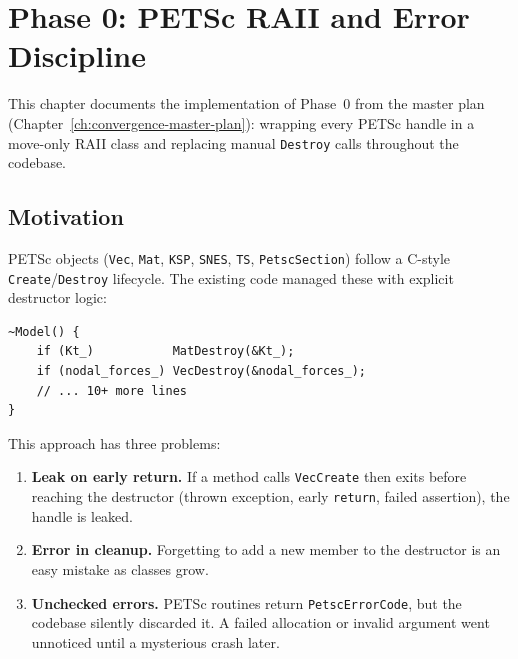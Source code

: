 
\chapter{Phase 0: PETSc RAII and Error Discipline}
\label{ch:phase0-petsc-raii}

This chapter documents the implementation of Phase~0 from the master plan
(Chapter~\ref{ch:convergence-master-plan}): wrapping every PETSc handle in
a move-only RAII class and replacing manual \texttt{Destroy} calls
throughout the codebase.

\section{Motivation}
\label{sec:phase0-motivation}

PETSc objects (\texttt{Vec}, \texttt{Mat}, \texttt{KSP}, \texttt{SNES},
\texttt{TS}, \texttt{PetscSection}) follow a C-style
\texttt{Create}/\texttt{Destroy} lifecycle.  The existing code managed
these with explicit destructor logic:

\begin{verbatim}
~Model() {
    if (Kt_)           MatDestroy(&Kt_);
    if (nodal_forces_) VecDestroy(&nodal_forces_);
    // ... 10+ more lines
}
\end{verbatim}

This approach has three problems:

\begin{enumerate}
  \item \textbf{Leak on early return.}  If a method calls
        \texttt{VecCreate} then exits before reaching the destructor
        (thrown exception, early \texttt{return}, failed assertion),
        the handle is leaked.
  \item \textbf{Error in cleanup.}  Forgetting to add a new member to the
        destructor is an easy mistake as classes grow.
  \item \textbf{Unchecked errors.}  PETSc routines return
        \texttt{PetscErrorCode}, but the codebase silently discarded it.
        A failed allocation or invalid argument went unnoticed until
        a mysterious crash later.
\end{enumerate}

